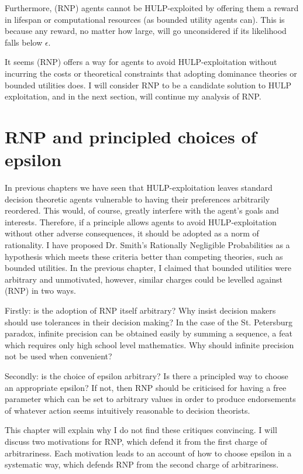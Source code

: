 \documentclass{article}
\begin{document}
Furthermore, (RNP) agents cannot be HULP-exploited by offering them a reward in lifespan or computational resources (as bounded utility agents can). This is because any reward, no matter how large, will go unconsidered if its likelihood falls below \(\epsilon\).

It seems (RNP) offers a way for agents to avoid HULP-exploitation without incurring the costs or theoretical constraints that adopting dominance theories or bounded utilities does. I will consider RNP to be a candidate solution to HULP exploitation, and in the next section, will continue my analysis of RNP.

\section{RNP and principled choices of epsilon}

In previous chapters we have seen that HULP-exploitation leaves standard decision theoretic agents vulnerable to having their preferences arbitrarily reordered. This would, of course, greatly interfere with the agent's goals and interests. Therefore, if a principle allows agents to avoid HULP-exploitation without other adverse consequences, it should be adopted as a norm of rationality. I have proposed Dr. Smith's Rationally Negligible Probabilities as a hypothesis which meets these criteria better than competing theories, such as bounded utilities. In the previous chapter, I claimed that bounded utilities were arbitrary and unmotivated, however, similar charges could be levelled against (RNP) in two ways.

Firstly: is the adoption of RNP itself arbitrary? Why insist decision makers should use tolerances in their decision making? In the case of the St. Petersburg paradox, infinite precision can be obtained easily by summing a sequence, a feat which requires only high school level mathematics. Why should infinite precision not be used when convenient?

Secondly: is the choice of epsilon arbitrary? Is there a principled way to choose an appropriate epsilon? If not, then RNP should be criticised for having a free parameter which can be set to arbitrary values in order to produce endorsements of whatever action seems intuitively reasonable to decision theorists. 

This chapter will explain why I do not find these critiques convincing. I will discuss two motivations for RNP, which defend it from the first charge of arbitrariness. Each motivation leads to an account of how to choose epsilon in a systematic way, which defends RNP from the second charge of arbitrariness. 
\end{document}
